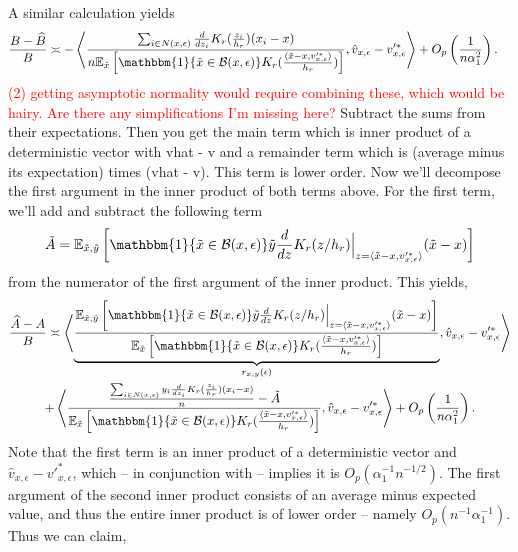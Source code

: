 \documentclass[11pt]{article}
\begin{document}
A similar calculation yields
\begin{align}
    \frac{B - \widehat{B}}{B} &\asymp - \left\langle\frac{\sum_{i \in N(x, \epsilon)}\frac{d}{dz_i}K_r(\frac{z_i}{h_r})(x_i - x)}{n \mathbb{E}_{\tilde{x}}\left[\mathbbm{1}\{\tilde{x} \in \mathcal{B}(x, \epsilon)\}K_r(\frac{\langle \tilde{x} - x, v'^*_{x, \epsilon}\rangle}{h_r})\right]} , \hat{v}_{x, \epsilon} - v'^*_{x, \epsilon}\right\rangle + O_p\left(\frac{1}{n\alpha_1^2}\right).
\end{align}
\textcolor{red}{(2) getting asymptotic normality would require combining these, which would be hairy. Are there any simplifications I'm missing here?} {\color{blue} Subtract the sums from their expectations. Then you get the main term which is inner product of a deterministic vector with vhat - v and a remainder term which is (average minus its expectation) times (vhat - v). This term is lower order.}
Now we'll decompose the first argument in the inner product of both terms above. For the first term, we'll add and subtract the following term
\[\tilde{A} = \mathbb{E}_{\tilde{x}, \tilde{y}}\left[\mathbbm{1}\{\tilde{x} \in \mathcal{B}(x, \epsilon)\}\tilde{y}\frac{d}{dz}K_r(z/h_r)\Big|_{z=\langle\tilde{x} - x, v'^*_{x, \epsilon}\rangle}(\tilde{x}-x)
\right]\]
from the numerator of the first argument of the inner product. This yields,
\begin{multline}
    \frac{\widehat{A} - A}{B} \asymp \left\langle \underbrace{\frac{\mathbb{E}_{\tilde{x}, \tilde{y}}\left[\mathbbm{1}\{\tilde{x} \in \mathcal{B}(x, \epsilon)\}\tilde{y}\frac{d}{dz}K_r(z/h_r)\Big|_{z=\langle\tilde{x} - x, v'^*_{x, \epsilon}\rangle}(\tilde{x}-x)
\right]}{\mathbb{E}_{\tilde{x}}\left[\mathbbm{1}\{\tilde{x} \in \mathcal{B}(x, \epsilon)\}K_r(\frac{\langle \tilde{x} - x, v'^*_{x, \epsilon}\rangle}{h_r})\right]}}_{r_{x,y}(\epsilon)}, \hat{v}_{x, \epsilon} - v'^*_{x, \epsilon}\right\rangle \\
+ \left\langle \frac{\frac{\sum_{i \in N(x, \epsilon)}y_i\frac{d}{dz_i}K_r(\frac{z_i}{h_r})(x_i - x)}{n} - \tilde{A}}{\mathbb{E}_{\tilde{x}}\left[\mathbbm{1}\{\tilde{x} \in \mathcal{B}(x, \epsilon)\}K_r(\frac{\langle \tilde{x} - x, v'^*_{x, \epsilon}\rangle}{h_r})\right]}, \hat{v}_{x, \epsilon} - v'^*_{x, \epsilon}\right\rangle + O_p\left(\frac{1}{n\alpha_1^2}\right).
\end{multline}
Note that the first term is an inner product of a deterministic vector and $\hat{v}_{x, \epsilon} - v'^*_{x, \epsilon}$, which -- in conjunction with  -- implies  it is $O_p(\alpha_1^{-1}n^{-{1/2}})$. The first argument of the second inner product consists of an average minus expected value, and thus the entire inner product is of lower order -- namely $O_p(n^{-1}\alpha_1^{-1})$. Thus we can claim,
\end{document}
